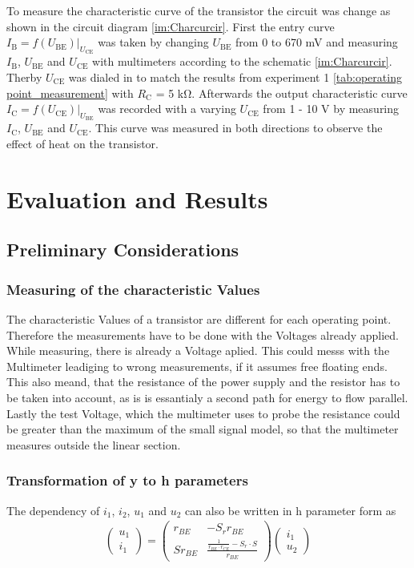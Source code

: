 \documentclass[11pt, a4paper]{article}
\begin{document}
To measure the characteristic curve of the transistor the circuit was change as shown in the circuit diagram \ref{im:Charcurcir}. 
First the entry curve $I_{\text{B}}=f(U_{\text{BE}})|_{U_{\text{CE}}}$ was taken by changing $U_{\text{BE}}$ from 0 to 670 \si{\milli\volt} and measuring $I_{\text{B}}$,
$U_{\text{BE}}$ and $U_{\text{CE}}$ with multimeters according to the schematic \ref{im:Charcurcir}. Therby $U_{\text{CE}}$ was dialed in to match the results from experiment 1 \ref{tab:operating point_measurement} with $R_{\text{C}}$ = 5 \si{\kilo\ohm}.
Afterwards the output characteristic curve $I_{\text{C}} = f(U_{\text{CE}})|_{U_{\text{BE}}}$ was recorded with a varying $U_{\text{CE}}$ from 1 - 10 \si{\volt} by measuring $I_{\text{C}}$, $U_{\text{BE}}$ and $U_{\text{CE}}$. This curve was measured in both directions to observe the effect of heat on the transistor.

\section{Evaluation and Results}
\subsection{Preliminary Considerations}

\subsubsection{Measuring of the characteristic Values}
The characteristic Values of a transistor are different for each operating point. Therefore the measurements have to be done with the Voltages already applied. While measuring, there is already a Voltage aplied. This could messs with the Multimeter leadiging to wrong measurements, if it assumes free floating ends. This also meand, that the resistance of the power supply and the resistor has to be taken into account, as is is essantialy a second path for energy to flow parallel. Lastly the test Voltage, which the multimeter uses to probe the resistance could be greater than the maximum of the small signal model, so that the multimeter measures outside the linear section.

\subsubsection{Transformation of y to h parameters}
The dependency of $i_1$, $i_2$, $u_1$ and $u_2$ can also be written in h parameter form as
\begin{align}
    \begin{pmatrix}
        u_1 \\
        i_1
    \end{pmatrix}
    = 
    \begin{pmatrix}
        r_{BE} & -S_r r_{BE} \\
        S r_{BE} & \frac{\frac{1}{r_{BE} \cdot r_{CE}} - S_r \cdot S}{r_{BE}}
    \end{pmatrix}
    \begin{pmatrix}
        i_1 \\
        u_2
    \end{pmatrix}
\end{align}
\end{document}
